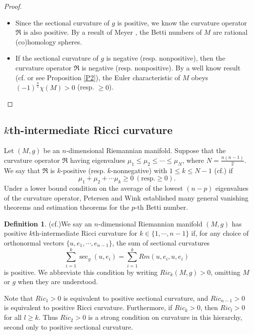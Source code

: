 \documentclass[12pt, twoside]{article}
\theoremstyle{definition}
\newtheorem{definition}[theorem]{Definition}
\numberwithin{equation}{section}
\begin{document}
\begin{proof}



	\begin{itemize}
		\item[(1)]Since the sectional curvature of $g$ is positive, we know the curvature operator $\mathfrak{R}$ is also positive. By a result of Meyer \cite{Mey71}, the Betti numbers of $M$ are rational (co)homology spheres.
		\item[(2)]If the sectional curvature of $g$ is negative (resp. nonpositive), then the curvature operator $\mathfrak{R}$ is negative (resp. nonpositive).  By a well know result (cf.\cite{BK78,Kul72} or see Proposition \ref{P2}), the Euler characteristic  of $M$ obeys $(-1)^{\frac{n}{2}}\chi(M)>0$ (resp. $\geq0$).
	\end{itemize}

\end{proof}


\subsection{$k$th-intermediate Ricci curvature}
Let $(M,g)$ be an $n$-dimensional Riemannian  manifold. Suppose that the curvature operator $\mathfrak{R}$ having eigenvalues $\mu_{1}\leq\mu_2\leq\cdots\leq\mu_{N}$, where $N=\frac{n(n-1)}{2}$. We say that  $\mathfrak{R}$ is $k$-positive (resp. $k$-nonnegative) with $1\leq k\leq N-1$ (cf.\cite{NPW23,NPWW23,PW21a}) if
	$$\mu_{1}+\mu_{2}+\cdots\mu_{k}\geq0\ (\textrm{resp.} \geq 0).$$
Under a lower bound condition on the average of the lowest $(n-p)$ eigenvalues of the curvature operator, Petersen and Wink \cite{PW21a} established many general vanishing theorems and estimation theorems for the $p$-th Betti number.
\begin{definition}(cf.\cite{KM18,Mou22,RS05})\label{D2}
We say an $n$-dimensional Riemannian manifold $(M,g)$ has positive $k$th-intermediate
Ricci curvature for $k\in\{1,\cdots,n-1\}$ if, for any choice of orthonormal vectors $\{u,e_{1},\cdots,e_{n-1}\}$, the
sum of sectional curvatures
$$\sum_{i=1}^{k}\sec_{g}(u,e_{i})=\sum_{i=1}^{k}Rm(u,e_{i},u,e_{i})$$
is positive. We abbreviate this condition by writing $Ric_{k}(M,g)>0$, omitting $M$ or $g$ when they are understood.
\end{definition}
Note that $Ric_{1}>0$ is equivalent to positive sectional curvature, and $Ric_{n-1}>0$ is equivalent to positive Ricci curvature. Furthermore, if $Ric_{k}>0$, then $Ric_{l}>0$ for all $l
\geq k$. Thus $Ric_{2}>0$ is a strong condition on curvature in this hierarchy, second only to positive sectional curvature.
\end{document}
